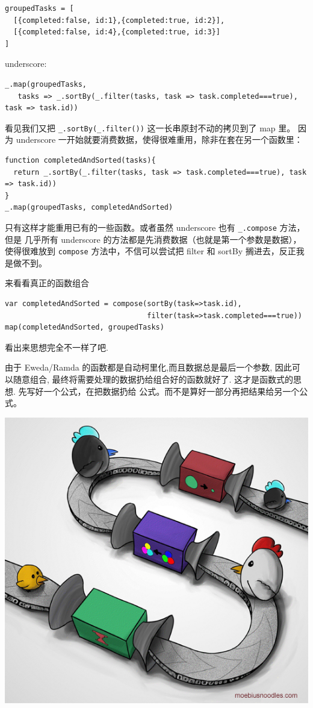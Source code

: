 \documentclass[a5paper]{book}
\begin{document}
\begin{verbatim}
groupedTasks = [
  [{completed:false, id:1},{completed:true, id:2}],
  [{completed:false, id:4},{completed:true, id:3}]
]
\end{verbatim}

underscore:

\begin{verbatim}
_.map(groupedTasks,
   tasks => _.sortBy(_.filter(tasks, task => task.completed===true), task => task.id))
\end{verbatim}

看见我们又把 \texttt{\_.sortBy(\_.filter())} 这一长串原封不动的拷贝到了 map 里。
因为 underscore
一开始就要消费数据，使得很难重用，除非在套在另一个函数里：

\begin{verbatim}
function completedAndSorted(tasks){
  return _.sortBy(_.filter(tasks, task => task.completed===true), task => task.id))
}
_.map(groupedTasks, completedAndSorted)
\end{verbatim}

只有这样才能重用已有的一些函数。或者虽然 underscore 也有 \texttt{\_.compose}
方法，但是 几乎所有 underscore
的方法都是先消费数据（也就是第一个参数是数据），使得很难放到 \texttt{compose}
方法中，不信可以尝试把 filter 和 sortBy 搁进去，反正我是做不到。

来看看真正的函数组合

\begin{verbatim}
var completedAndSorted = compose(sortBy(task=>task.id),
                                 filter(task=>task.completed===true))
map(completedAndSorted, groupedTasks)
\end{verbatim}

看出来思想完全不一样了吧.

由于 Eweda/Ramda 的函数都是自动柯里化,而且数据总是最后一个参数,
因此可以随意组合, 最终将需要处理的数据扔给组合好的函数就好了.
这才是函数式的思想. 先写好一个公式，在把数据扔给
公式。而不是算好一部分再把结果给另一个公式。

\includegraphics[width=.9\linewidth]{./images/higherorder/ThreeFunctionMachines.jpg}
\end{document}
